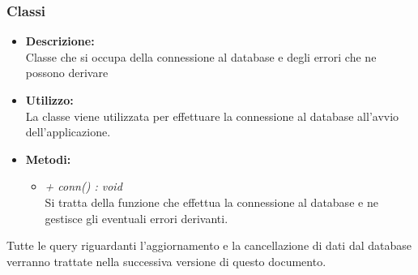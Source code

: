     \subsubsection{Classi}
        \begin{itemize}
          \item \textbf{Descrizione: }\\
          Classe che si occupa della connessione al database e degli errori che ne possono derivare
          \item \textbf{Utilizzo: }\\
          La classe viene utilizzata per effettuare la connessione al database all'avvio dell'applicazione.
          \item \textbf{Metodi: }\\
          \begin{itemize}
            \item \emph{+ conn() : void}\\
            Si tratta della funzione che effettua la connessione al database e ne gestisce gli eventuali errori derivanti.
          \end{itemize}
        \end{itemize}
        Tutte le query riguardanti l'aggiornamento e la cancellazione di dati dal database verranno trattate nella successiva versione di questo documento.
